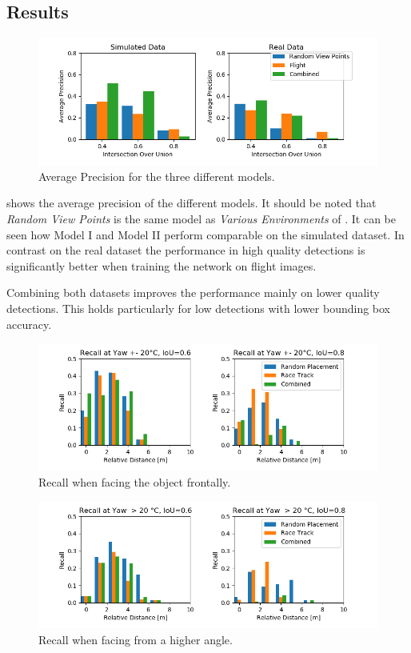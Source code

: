 \subsection{Results}

\begin{figure}[htbp]
	\includegraphics[width=\textwidth]{fig/view_bar}
	\caption{Average Precision for the three different models.}
	\label{fig:view_bar}
\end{figure}

 shows the average precision of the different models. It should be noted that \textit{Random View Points} is the same model as \textit{Various Environments} of . It can be seen how Model I and Model II perform comparable on the simulated dataset. In contrast on the real dataset the performance in high quality detections is significantly better when training the network on flight images.

Combining both datasets improves the performance mainly on lower quality detections. This holds particularly for low detections with lower bounding box accuracy.


\begin{figure}[htbp]
	\centering
	\includegraphics[width=\textwidth]{fig/recall_front}
	\caption{Recall when facing the object frontally.}
	\label{fig:recall_front}
\end{figure}

\begin{figure}[htbp]
	\centering
	\includegraphics[width=\textwidth]{fig/recall_angle}
	\caption{Recall when facing from a higher angle.}
	\label{fig:recall_angle}
\end{figure}

